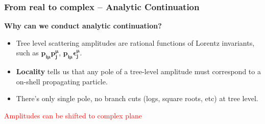 \documentclass{beamer}
\begin{document}
\begin{frame}
    \frametitle{From real to complex -- Analytic Continuation}
    \textbf{Why can we conduct analytic continuation?}
\begin{itemize}
  \item Tree level scattering amplitudes are rational functions of Lorentz invariants, such as $\bm{p_{i\mu}p_j^\mu}$, $\bm{p_{i\mu}\epsilon_j^\mu}$.
  \item \textbf{Locality} tells us that any pole of a tree-level amplitude must correspond to a on-shell propagating particle. 
  \item There's only single pole, no branch cuts (logs, square roots, etc) at tree level.
\end{itemize}
    \begin{center}
    \end{center}
\vspace{0.5em}
\centering
\textcolor{red}{Amplitudes can be shifted to complex plane}
\end{frame}
\end{document}
